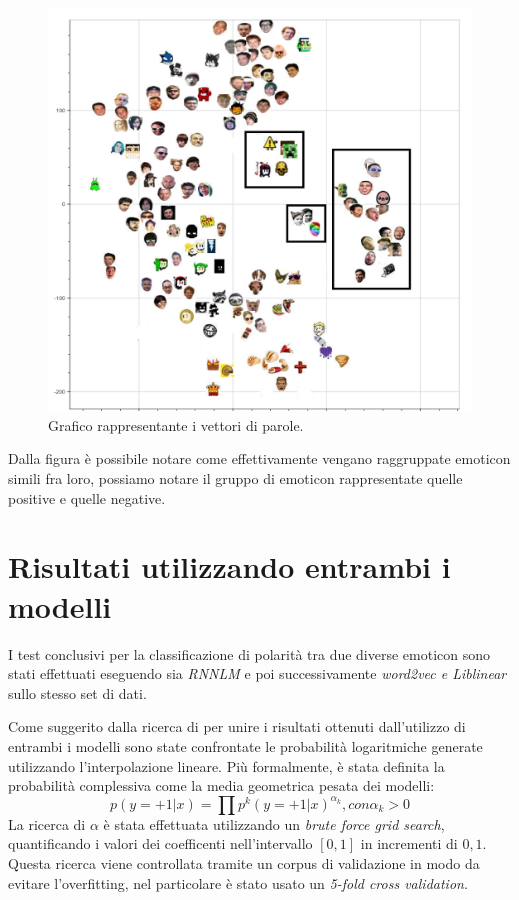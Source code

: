 \documentclass[a4paper,12pt,openright,twoside]{report}
\theoremstyle{definition}
\begin{document}
\begin{figure}[H]
	\centering
	\includegraphics[scale=0.4]{Immagini/tsne.png}
	\caption{Grafico rappresentante i vettori di parole.}
	\label{fig:tSNE}
\end{figure}

Dalla figura è possibile notare come effettivamente vengano raggruppate emoticon simili fra loro, possiamo notare
il gruppo di emoticon rappresentate quelle positive e quelle negative.
\section{Risultati utilizzando entrambi i modelli}
I test conclusivi per la classificazione di polarità tra due diverse emoticon
sono stati effettuati eseguendo sia \emph{RNNLM} e poi successivamente \emph{word2vec e Liblinear} sullo stesso set di dati.

Come suggerito dalla ricerca di \cite{Mik2014} per unire i risultati ottenuti dall'utilizzo di entrambi i modelli
sono state confrontate le probabilità logaritmiche generate utilizzando l'interpolazione lineare.
Più formalmente, è stata definita la probabilità complessiva come la media geometrica pesata
dei modelli:
\begin{equation}
	p(y=+1|x)=\prod p^k(y=+1|x)^{\alpha_k}, con \alpha_k > 0
	\label{eq:media}
\end{equation}
La ricerca di $\alpha$ è stata effettuata utilizzando un \emph{brute force grid search}, quantificando
i valori dei coefficenti nell'intervallo $[0,1]$ in incrementi di $0,1$.
Questa ricerca viene controllata tramite un corpus di validazione in modo da evitare l'overfitting, nel particolare
è stato usato un \emph{5-fold cross validation}. 
 
\end{document}
